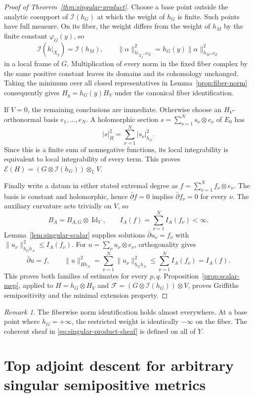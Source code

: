 \documentclass[11pt,reqno]{amsart}
\numberwithin{equation}{section}
\theoremstyle{definition}
\theoremstyle{remark}
\newtheorem{remark}[theorem]{Remark}
\newcommand{\Id}{\operatorname{Id}}
\begin{document}
\begin{proof}[Proof of Theorem~\ref{thm:singular-product}]
Choose a base point outside the analytic cosupport of
$\mathcal I(h_G)$ at which the weight of $h_G$ is finite.  Such points
have full measure.  On its fiber, the weight differs from the weight
of $h_M$ by the finite constant $\varphi_G(y)$, so
\[
 \mathcal I(h|_{X_y})=\mathcal I(h_M),\qquad
 \|\alpha\|_{h|_{X_y},\omega_Z}^2
       =h_G(y)\|\alpha\|_{h_M,\omega_Z}^2
\]
in a local frame of $G$.  Multiplication of every norm in the fixed
fiber complex by the same positive constant leaves its domains and
its cohomology unchanged.  Taking the minimum over all closed
representatives in Lemma~\ref{prop:fiber-norm} consequently gives
$H_y=h_G(y)H_V$ under the canonical fiber identification.

If $V=0$, the remaining conclusions are immediate.  Otherwise choose
an $H_V$-orthonormal basis $e_1,\ldots,e_N$.  A holomorphic section
$s=\sum_{\nu=1}^N s_\nu\otimes e_\nu$ of $E_0$ has
\[
 |s|_H^2=\sum_{\nu=1}^N|s_\nu|_{h_G}^2.
\]
Since this is a finite sum of nonnegative functions, its local
integrability is equivalent to local integrability of every term.
This proves
$\mathscr E(H)=(G\otimes\mathcal I(h_G))\otimes_{\mathbb C}V$.

Finally write a datum in either stated extremal degree as
$f=\sum_{\nu=1}^N f_\nu\otimes e_\nu$.  The basis is constant and
holomorphic, hence $\bar\partial f=0$ implies
$\bar\partial f_\nu=0$ for every $\nu$.  The auxiliary curvature
acts trivially on $V$, so
\[
 B_A=B_{A,G}\otimes\Id_V,\qquad
 I_A(f)=\sum_{\nu=1}^N I_A(f_\nu)<\infty.
\]
Lemma~\ref{lem:singular-scalar} supplies solutions
$\bar\partial u_\nu=f_\nu$ with
$\|u_\nu\|_{h_Gh_A}^2\le I_A(f_\nu)$.
For $u=\sum_\nu u_\nu\otimes e_\nu$, orthogonality gives
\[
 \bar\partial u=f,\qquad
 \|u\|_{Hh_A}^2
   =\sum_{\nu=1}^N\|u_\nu\|_{h_Gh_A}^2
   \le\sum_{\nu=1}^N I_A(f_\nu)=I_A(f).
\]
This proves both families of estimates for every $p,q$.
Proposition~\ref{prop:scalar-mep}, applied to $H=h_G\otimes H_V$
and $\mathcal F=(G\otimes\mathcal I(h_G))\otimes V$, proves
Griffiths semipositivity and the minimal extension property.
\end{proof}

\begin{remark}\label{rem:singular-scope}
The fiberwise norm identification holds almost everywhere.
At a base point where $h_G=+\infty$, the restricted weight is
identically $-\infty$ on the fiber.  The coherent sheaf in
\eqref{eq:singular-product-sheaf} is defined on all of $Y$.
\end{remark}
\section{Top adjoint descent for arbitrary singular semipositive metrics}
\label{sec:singular-top-adjoint}
\end{document}
